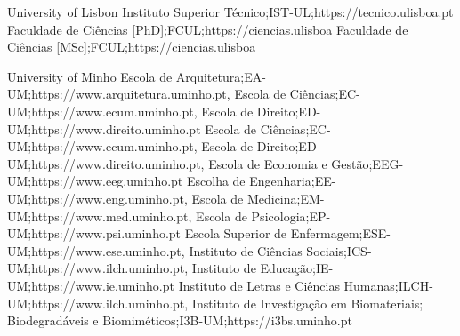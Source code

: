 \begin{ntUniversity}{University of Lisbon}
                  {{Instituto Superior Técnico};{IST-UL};{https://tecnico.ulisboa.pt}}
                  {{Faculdade de Ciências [PhD]};{FCUL};{https://ciencias.ulisboa}}
                  {{Faculdade de Ciências [MSc]};{FCUL};{https://ciencias.ulisboa}}
\end{ntUniversity}

\begin{ntUniversity}{University of Minho}
                  {{{Escola de Arquitetura};{EA-UM};{https://www.arquitetura.uminho.pt}},%
                  {{Escola de Ciências};{EC-UM};{https://www.ecum.uminho.pt}},%
                  {{Escola de Direito};{ED-UM};{https://www.direito.uminho.pt}}}
                  {{{Escola de Ciências};{EC-UM};{https://www.ecum.uminho.pt}},%
                  {{Escola de Direito};{ED-UM};{https://www.direito.uminho.pt}},%
                  {{Escola de Economia e Gestão};{EEG-UM};{https://www.eeg.uminho.pt}}}
                  {{{Escolha de Engenharia};{EE-UM};{https://www.eng.uminho.pt}},%
                  {{Escola de Medicina};{EM-UM};{https://www.med.uminho.pt}},%
                  {{Escola de Psicologia};{EP-UM};{https://www.psi.uminho.pt}}}
                  {{{Escola Superior de Enfermagem};{ESE-UM};{https://www.ese.uminho.pt}},%
                  {{Instituto de Ciências Sociais};{ICS-UM};{https://www.ilch.uminho.pt}},%
                  {{Instituto de Educação};{IE-UM};{https://www.ie.uminho.pt}}}
                  {{{Instituto de Letras e Ciências Humanas};{ILCH-UM};{https://www.ilch.uminho.pt}},%
                  {{Instituto de Investigação em Biomateriais; Biodegradáveis e Biomiméticos};{I3B-UM};{https://i3bs.uminho.pt}}}
\end{ntUniversity}
%

